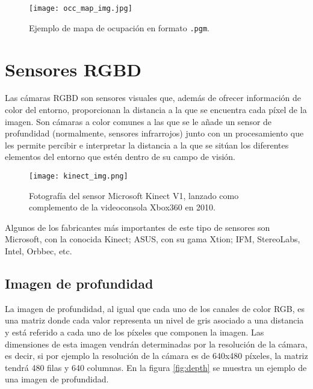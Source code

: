 \begin{figure}[h]
\begin{center} \label{fig:occ_map}
\texttt{[image: occ\_map\_img.jpg]}
\end{center}
\caption{Ejemplo de mapa de ocupación en formato \texttt{.pgm}.}
\end{figure}

\section{Sensores RGBD}

Las cámaras RGBD son sensores visuales que, además de ofrecer información de color del entorno, proporcionan la distancia a la que se encuentra cada píxel de la imagen. Son cámaras a color comunes a las que se le añade un sensor de profundidad (normalmente, sensores infrarrojos) junto con un procesamiento que les permite percibir e interpretar la distancia a la que se sitúan los diferentes elementos del entorno que estén dentro de su campo de visión.\\

\begin{figure}[h]
	\begin{center} 
		\texttt{[image: kinect\_img.png]}
	\end{center}
	\caption{Fotografía del sensor Microsoft Kinect V1, lanzado como complemento de la videoconsola Xbox360 en 2010. \cite{kinectv1}}
	\label{fig:kinect}
\end{figure}

Algunos de los fabricantes más importantes de este tipo de sensores son Microsoft, con la conocida Kinect; ASUS, con su gama Xtion; IFM, StereoLabs, Intel, Orbbec, etc.\\

\subsection{Imagen de profundidad}

La imagen de profundidad, al igual que cada uno de los canales de color RGB, es una matriz donde cada valor representa un nivel de gris asociado a una distancia y está referido a cada uno de los píxeles que componen la imagen. Las dimensiones de esta imagen vendrán determinadas por la resolución de la cámara, es decir, si por ejemplo la resolución de la cámara es de 640x480 píxeles, la matriz tendrá 480 filas y 640 columnas. En la figura \ref{fig:depth} se muestra un ejemplo de una imagen de profundidad. \\

